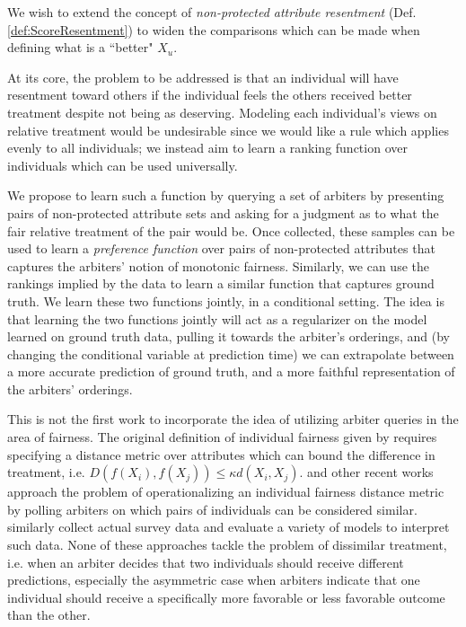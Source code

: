     We wish to extend the concept of \emph{non-protected attribute resentment} (Def. \ref{def:ScoreResentment}) to widen the comparisons which can be made when defining what is a ``better" $X_u$.
    
    At its core, the problem to be addressed is that an individual will have resentment toward others if the individual feels the others received better treatment despite not being as deserving.  Modeling each individual's views on relative treatment would be undesirable since we would like a rule which applies evenly to all individuals; we instead aim to learn a ranking function over individuals which can be used universally.  
    
    We propose to learn such a function by querying a set of arbiters by presenting pairs of non-protected attribute sets and asking for a judgment as to what the fair relative treatment of the pair would be. Once collected, these samples can be used to learn a \emph{preference function} over pairs of non-protected attributes that captures the arbiters' notion of monotonic fairness. Similarly, we can use the rankings implied by the data to learn a similar function that captures ground truth. We learn these two functions jointly, in a conditional setting. The idea is that learning the two functions jointly will act as a regularizer on the model learned on ground truth data, pulling it towards the arbiter's orderings, and (by changing the conditional variable at prediction time) we can extrapolate between a more accurate prediction of ground truth, and a more faithful representation of the arbiters' orderings.

    This is not the first work to incorporate the idea of utilizing arbiter queries in the area of fairness.  The original definition of individual fairness given by  \citet{dwork2012fairness} requires specifying a distance metric over attributes which can bound the difference in treatment, i.e. $D\left(f(X_i), f(X_j)\right) \le \kappa d(X_i, X_j)$. \citet{ilvento2019metric} and other recent works \citep{jung2019eliciting,lahoti2019operationalizing,wang2019empirical} approach the problem of operationalizing an individual fairness distance metric by polling arbiters on which pairs of individuals can be considered similar.  \citet{wang2019empirical} similarly collect actual survey data and evaluate a variety of models to interpret such data.  None of these approaches tackle the problem of dissimilar treatment, i.e. when an arbiter decides that two individuals should receive different predictions, especially the asymmetric case when arbiters indicate that one individual should receive a specifically more favorable or less favorable outcome than the other.
    
